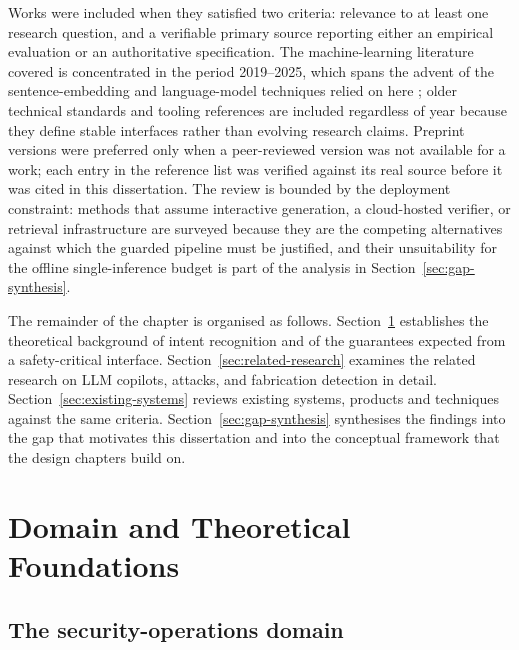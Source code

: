 Works were included when they satisfied two criteria: relevance to at least one
research question, and a verifiable primary source reporting either an empirical
evaluation or an authoritative specification. The machine-learning literature
covered is concentrated in the period 2019--2025, which spans the advent of the
sentence-embedding and language-model techniques relied on here
\parencite{reimers2019sbert,lewis2020rag}; older technical standards and
tooling references are included regardless of year because they define stable
interfaces rather than evolving research claims. Preprint versions were
preferred only when a peer-reviewed version was not available for a work; each
entry in the reference list was verified against its real source before it was
cited in this dissertation. The review is bounded by the deployment constraint:
methods that assume interactive generation, a cloud-hosted verifier, or
retrieval infrastructure are surveyed because they are the competing
alternatives against which the guarded pipeline must be justified, and their
unsuitability for the offline single-inference budget is part of the analysis
in Section~\ref{sec:gap-synthesis}.

The remainder of the chapter is organised as follows.
Section~\ref{sec:domain-foundations} establishes the theoretical background of
intent recognition and of the guarantees expected from a safety-critical
interface. Section~\ref{sec:related-research} examines the related research on
LLM copilots, attacks, and fabrication detection in detail.
Section~\ref{sec:existing-systems} reviews existing systems, products and
techniques against the same criteria. Section~\ref{sec:gap-synthesis} synthesises
the findings into the gap that motivates this dissertation and into the
conceptual framework that the design chapters build on.


\section{Domain and Theoretical Foundations}\label{sec:domain-foundations}

\subsection*{The security-operations domain}

